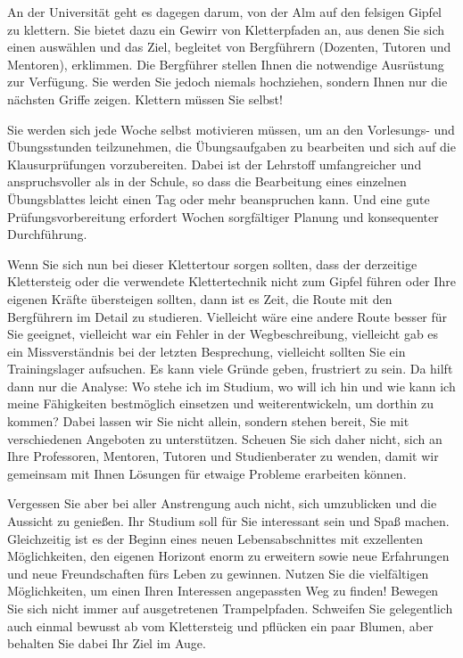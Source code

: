 {    %

    An der Universität geht es dagegen darum, von der Alm auf den felsigen Gipfel zu klettern. Sie bietet dazu ein Gewirr von Kletterpfaden an, aus denen Sie sich einen auswählen und das Ziel, begleitet von Bergführern (Dozenten, Tutoren und Mentoren), erklimmen. Die Bergführer stellen Ihnen die notwendige Ausrüstung zur Verfügung. Sie werden Sie jedoch niemals hochziehen, sondern Ihnen nur die nächsten Griffe zeigen. Klettern müssen Sie selbst!


    Sie werden sich jede Woche selbst motivieren müssen, um an den
    Vorlesungs- und Übungsstunden teilzunehmen, die Übungsaufgaben zu bearbeiten und sich auf die Klausurprüfungen vorzubereiten. Dabei ist der Lehrstoff umfangreicher und anspruchsvoller als in der Schule, so dass die Bearbeitung eines einzelnen Übungsblattes leicht einen Tag oder mehr beanspruchen kann. Und eine gute Prüfungsvorbereitung erfordert Wochen sorgfältiger Planung und konsequenter Durchführung.


    Wenn Sie sich nun bei dieser Klettertour sorgen sollten, dass der derzeitige Klettersteig oder die verwendete Klettertechnik nicht zum Gipfel führen oder Ihre eigenen Kräfte übersteigen sollten, dann ist es Zeit, die Route mit den Bergführern im Detail zu studieren. Vielleicht wäre eine andere Route besser für Sie geeignet, vielleicht war ein Fehler in der Wegbeschreibung, vielleicht gab es ein Missverständnis bei der letzten Besprechung, vielleicht sollten Sie ein Trainingslager aufsuchen. Es kann viele Gründe geben, frustriert zu sein. Da hilft dann nur die Analyse: Wo stehe ich im Studium, wo will ich hin und wie kann ich meine Fähigkeiten bestmöglich einsetzen und weiterentwickeln, um dorthin zu kommen? Dabei lassen wir Sie nicht allein, sondern stehen bereit, Sie mit verschiedenen Angeboten zu unterstützen. Scheuen Sie sich daher nicht, sich an Ihre Professoren, Mentoren, Tutoren und Studienberater zu wenden, damit wir gemeinsam mit Ihnen Lösungen für etwaige Probleme erarbeiten können.


    Vergessen Sie aber bei aller Anstrengung auch nicht, sich umzublicken und die Aussicht zu genießen. Ihr Studium soll für Sie interessant sein und Spaß machen. Gleichzeitig ist es der Beginn eines neuen Lebensabschnittes mit exzellenten Möglichkeiten, den eigenen Horizont enorm zu erweitern sowie neue Erfahrungen und neue Freundschaften fürs Leben zu gewinnen. Nutzen Sie die vielfältigen Möglichkeiten, um einen Ihren Interessen angepassten Weg zu finden! Bewegen Sie sich nicht immer auf ausgetretenen Trampelpfaden. Schweifen Sie gelegentlich auch einmal bewusst ab vom Klettersteig und pflücken ein paar Blumen, aber behalten Sie dabei Ihr Ziel im Auge.

}
